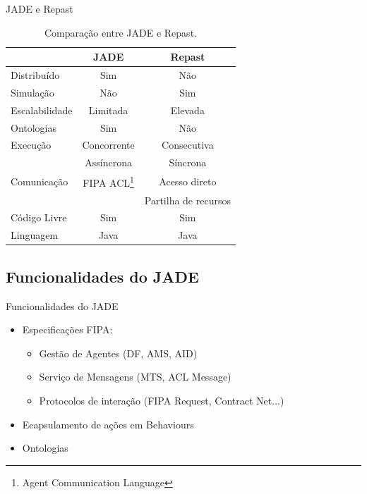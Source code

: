 \begin{frame}{JADE e Repast}
	\begin{table}[h]
		\label{tab:jadevsrep}
		\caption{Comparação entre JADE e Repast.}
		\small
		\begin{center}
			\begin{tabular}{l|cc}
			\hline

			\hline
			\textbf{} & \textbf{JADE} & \textbf{Repast} \\ %
			\hline
				Distribuído & Sim & Não \\ 
			\hline
				Simulação & Não & Sim \\ 
			\hline
				Escalabilidade & Limitada & Elevada \\ 
			\hline
				Ontologias & Sim & Não \\
			\hline
				Execução	& Concorrente	& Consecutiva  	\\
							& Assíncrona	& Síncrona 	\\
			\hline
				Comunicação & FIPA ACL\footnote{ Agent Communication Language} &  Acesso direto  \\ %
							  &			 &  Partilha de recursos \\
			\hline
				Código Livre & Sim & Sim \\ 
			\hline
				Linguagem & Java & Java \\ 
			\hline
			\end{tabular}
		\end{center}
	\end{table}
\end{frame}

\subsection{Funcionalidades do JADE}
\begin{frame}{Funcionalidades do JADE}
	\begin{itemize}
		\item Especificações FIPA:
		\begin{itemize}
			\item Gestão de Agentes (DF, AMS, AID)
			\item Serviço de Mensagens (MTS, ACL Message)
			\item Protocolos de interação (FIPA Request, Contract Net...)
		\end{itemize}
		\item Ecapsulamento de ações em Behaviours
		\item Ontologias
	\end{itemize}
\end{frame}


